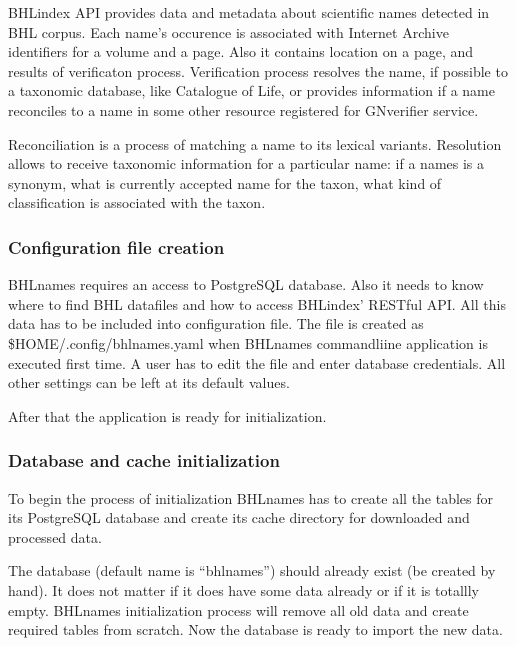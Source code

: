 \documentclass[
]{article}
\begin{document}
BHLindex API provides data and metadata about scientific names detected
in BHL corpus. Each name's occurence is associated with Internet Archive
identifiers for a volume and a page. Also it contains location on a
page, and results of verificaton process. Verification process resolves
the name, if possible to a taxonomic database, like Catalogue of Life,
or provides information if a name reconciles to a name in some other
resource registered for GNverifier service.

Reconciliation is a process of matching a name to its lexical variants.
Resolution allows to receive taxonomic information for a particular
name: if a names is a synonym, what is currently accepted name for the
taxon, what kind of classification is associated with the taxon.

\hypertarget{configuration-file-creation}{%
\subsubsection{Configuration file
creation}\label{configuration-file-creation}}

BHLnames requires an access to PostgreSQL database. Also it needs to
know where to find BHL datafiles and how to access BHLindex' RESTful
API. All this data has to be included into configuration file. The file
is created as \$HOME/.config/bhlnames.yaml when BHLnames commandliine
application is executed first time. A user has to edit the file and
enter database credentials. All other settings can be left at its
default values.

After that the application is ready for initialization.

\hypertarget{database-and-cache-initialization}{%
\subsubsection{Database and cache
initialization}\label{database-and-cache-initialization}}

To begin the process of initialization BHLnames has to create all the
tables for its PostgreSQL database and create its cache directory for
downloaded and processed data.

The database (default name is ``bhlnames'') should already exist (be
created by hand). It does not matter if it does have some data already
or if it is totallly empty. BHLnames initialization process will remove
all old data and create required tables from scratch. Now the database
is ready to import the new data.
\end{document}
